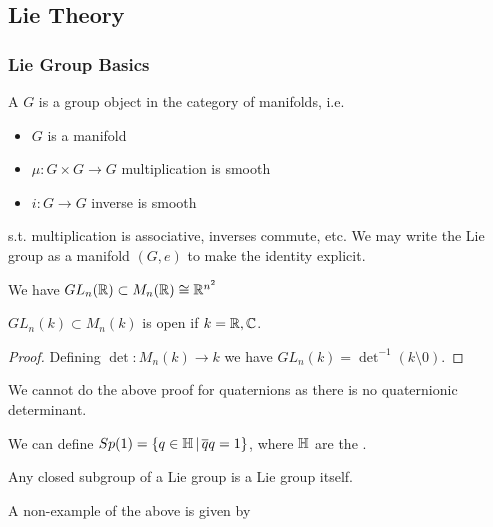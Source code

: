 \documentclass{article}
\begin{document}
\subsection{Lie Theory}
\subsubsection{Lie Group Basics}

\begin{definition}
A  $G$ is a group object in the category of manifolds, i.e. 
\begin{itemize}
    \item $G$ is a manifold
    \item $\mu : G \times G \to G$ multiplication is smooth 
    \item $i : G \to G$ inverse is smooth
\end{itemize}
s.t. multiplication is associative, inverses commute, etc. We may write the Lie group as a  manifold $(G,e)$ to make the identity explicit. 
\end{definition}

\begin{example}
We have $GL_n(\mathbb{R})\subset M_n(\mathbb{R}) \cong \mathbb{R}^{n^2}$
\end{example}

\begin{lemma}
	$GL_n(k)\subset M_n(k)$ is open if $k=\mathbb{R},\mathbb{C}$.
\end{lemma}
\begin{proof}
	Defining $\det : M_n(k) \to k$ we have $GL_n(k) = \det^{-1}(k\setminus 0)$.
\end{proof}

\begin{remark}
	We cannot do the above proof for quaternions as there is no quaternionic determinant. 
\end{remark}

\begin{example}
	We can define $Sp(1) = \left\{ q \in \mathbb{H} \, | \, \overline{q}q = 1 \right\}$, where $\mathbb{H}$ are the . 
\end{example}

\begin{theorem}[Cartan]
Any closed subgroup of a Lie group is a Lie group itself. 
\end{theorem}

\begin{example}
A non-example of the above is given by 
\end{example}
\end{document}
